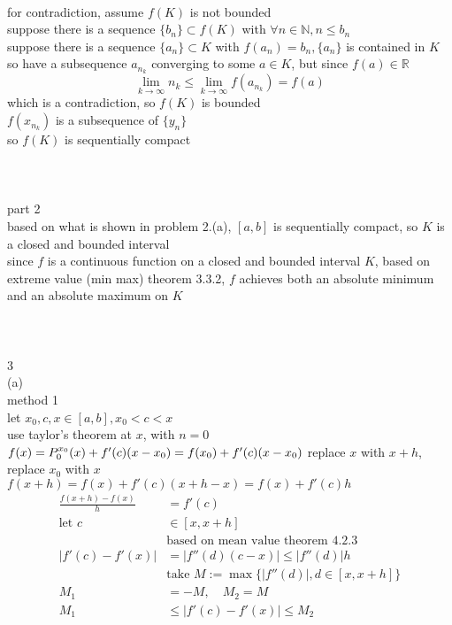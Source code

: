 \documentclass[12pt, border = 4pt, multi]{article} %
\begin{document}
\\
for contradiction, assume $f(K)$ is not bounded\\
suppose there is a sequence $\{b_n\} \subset f(K)$ with $\forall n \in \mathbb{N}, n \leq b_n$\\
suppose there is a sequence $\{a_n\} \subset K$ with $f(a_n) = b_n, \{a_n\}$ is contained in $K$ so have a subsequence $a_{n_k}$ converging to some $a \in K$, but since $f(a) \in \mathbb{R}$
\[\lim_{k \rightarrow \infty} n_k \leq \lim_{k \rightarrow \infty} f(a_{n_k}) = f(a)\]
which is a contradiction, so $f(K)$ is bounded\\
$f(x_{n_k})$ is a subsequence of $\{y_n\}$\\
so $f(K)$ is sequentially compact\\
\\
\\
\\
part 2\\
based on what is shown in problem 2.(a), $[a, b]$ is sequentially compact, so $K$ is a closed and bounded interval\\
since $f$ is a continuous function on a closed and bounded interval $K$, based on extreme value (min max) theorem 3.3.2, $f$ achieves both an absolute minimum and an absolute maximum on $K$\\
\\
\\
\\
3\\
(a)\\
method 1\\
let $x_0, c, x \in [a, b], x_0 < c < x$\\
use taylor's theorem at $x$, with $n = 0$\\
$f(x) = P_0 ^ {x_0}(x) + f'(c)(x - x_0) = f(x_0) + f'(c)(x - x_0)\\$
replace $x$ with $x + h$, replace $x_0$ with $x$\\
$f(x + h) = f(x) + f'(c)(x + h - x) = f(x) + f'(c)h$
\begin{align*}
\frac{f(x + h) - f(x)}{h} &= f'(c)\\
\text{let } c &\in [x, x + h]\\
&\text{based on mean value theorem 4.2.3}\\
|f'(c) - f'(x)| &= |f''(d)(c - x)| \leq |f''(d)|h\\
&\text{take } M := \max\{|f''(d)|, d \in [x, x + h]\}\\
M_1 &= -M,\quad M_2 = M\\
M_1 &\leq |f'(c) - f'(x)| \leq M_2\\
\end{align*}
\end{document}
